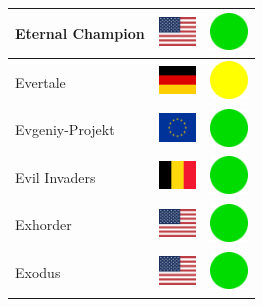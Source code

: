 \documentclass[12pt, a4paper, twoside]{report}
\begin{document}
\begin{center}
\begin{longtable}{|p{5cm}|p{2cm}|p{2cm}|}
 Eternal Champion                                           & \includegraphics[width=1cm]{../img/flags/us} &   \includegraphics[width=1cm]{../likes/y} \\ \hline
 Evertale                                                   & \includegraphics[width=1cm]{../img/flags/de} &   \includegraphics[width=1cm]{../likes/m} \\ \hline
 Evgeniy-Projekt                                            & \includegraphics[width=1cm]{../img/flags/eu} &   \includegraphics[width=1cm]{../likes/y} \\ \hline
 Evil Invaders                                              & \includegraphics[width=1cm]{../img/flags/be} &   \includegraphics[width=1cm]{../likes/y} \\ \hline
 Exhorder                                                   & \includegraphics[width=1cm]{../img/flags/us} &   \includegraphics[width=1cm]{../likes/y} \\ \hline
 Exodus                                                     & \includegraphics[width=1cm]{../img/flags/us} &   \includegraphics[width=1cm]{../likes/y} \\ \hline

\end{longtable}
\end{center}
\end{document}
